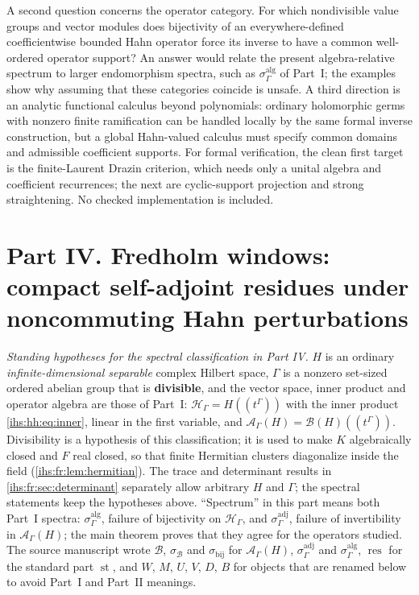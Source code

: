 \documentclass[11pt,a4paper]{article}
\numberwithin{equation}{section}
\theoremstyle{definition}
\theoremstyle{remark}
\newcommand{\K}{K}
\newcommand{\Fld}{F}
\newcommand{\Hil}{\mathcal H_\Gamma}
\newcommand{\B}{\mathcal B(H)}
\newcommand{\Ahh}{\mathcal A_\Gamma(H)}
\newcommand{\st}{\operatorname{st}}
\begin{document}
A second question concerns the operator category. For which nondivisible
value groups and vector modules does bijectivity of an everywhere-defined
coefficientwise bounded Hahn operator force its inverse to have a common
well-ordered operator support? An answer would relate the present
algebra-relative spectrum to larger endomorphism spectra, such as
$\sigma^{\mathrm{alg}}_\Gamma$ of Part~I; the examples show why assuming that
these categories coincide is unsafe. A third direction is an analytic
functional calculus beyond polynomials: ordinary holomorphic germs with
nonzero finite ramification can be handled locally by the same formal
inverse construction, but a global Hahn-valued calculus must specify common
domains and admissible coefficient supports. For formal verification, the
clean first target is the finite-Laurent Drazin criterion, which needs only a
unital algebra and coefficient recurrences; the next are cyclic-support
projection and strong straightening. No checked implementation is included.

\clearpage
\part*{Part IV. Fredholm windows: compact self-adjoint residues under noncommuting Hahn perturbations}

\emph{Standing hypotheses for the spectral classification in Part IV.} $H$ is an ordinary
\emph{infinite-dimensional separable} complex Hilbert space, $\Gamma$ is a
nonzero set-sized ordered abelian group that is \textbf{divisible}, and the
vector space, inner product and operator algebra are those of Part~I:
$\Hil=H((t^\Gamma))$ with the inner product \eqref{ihs:hh:eq:inner}, linear in
the first variable, and $\Ahh=\B((t^\Gamma))$. Divisibility is a hypothesis
of this classification; it is used to make $\K$ algebraically closed and $\Fld$
real closed, so that finite Hermitian clusters diagonalize inside the field
(\cref{ihs:fr:lem:hermitian}). The trace and determinant results in
\cref{ihs:fr:sec:determinant} separately allow arbitrary $H$ and $\Gamma$;
the spectral statements keep the hypotheses above. ``Spectrum'' in this part means both Part~I
spectra: $\sigma^{\mathrm{alg}}_\Gamma$, failure of bijectivity on $\Hil$,
and $\sigma^{\mathrm{adj}}_\Gamma$, failure of invertibility in $\Ahh$; the
main theorem proves that they agree for the operators studied. The source
manuscript wrote $\mathscr B$, $\sigma_{\mathscr B}$ and $\sigma_{\mathrm{bij}}$
for $\Ahh$, $\sigma^{\mathrm{adj}}_\Gamma$ and $\sigma^{\mathrm{alg}}_\Gamma$,
$\operatorname{res}$ for the standard part $\st$, and $W$, $M$, $U$, $V$, $D$, $B$ for
objects that are renamed below to avoid Part~I and Part~II meanings.
\end{document}
